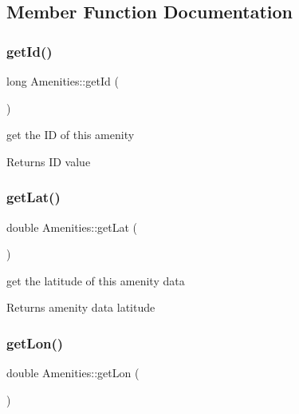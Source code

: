 \subsection{Member Function Documentation}
\mbox{\label{class_amenities_aadb0f5678804b68404611afbb09ba20e}} 
\subsubsection{\texorpdfstring{get\+Id()}{getId()}}
{\footnotesize\ttfamily long Amenities\+::get\+Id (\begin{DoxyParamCaption}{ }\end{DoxyParamCaption})\hspace{0.3cm}{\ttfamily [inline]}}

get the ID of this amenity \begin{DoxyReturn}{Returns}
ID value 
\end{DoxyReturn}
\mbox{\label{class_amenities_a5e0767560a831dd7ffdf033cfa335189}} 
\subsubsection{\texorpdfstring{get\+Lat()}{getLat()}}
{\footnotesize\ttfamily double Amenities\+::get\+Lat (\begin{DoxyParamCaption}{ }\end{DoxyParamCaption})\hspace{0.3cm}{\ttfamily [inline]}}

get the latitude of this amenity data \begin{DoxyReturn}{Returns}
amenity data latitude 
\end{DoxyReturn}
\mbox{\label{class_amenities_ac1e4e374a7da9bafb76db8a36de3640a}} 
\subsubsection{\texorpdfstring{get\+Lon()}{getLon()}}
{\footnotesize\ttfamily double Amenities\+::get\+Lon (\begin{DoxyParamCaption}{ }\end{DoxyParamCaption})\hspace{0.3cm}{\ttfamily [inline]}}

